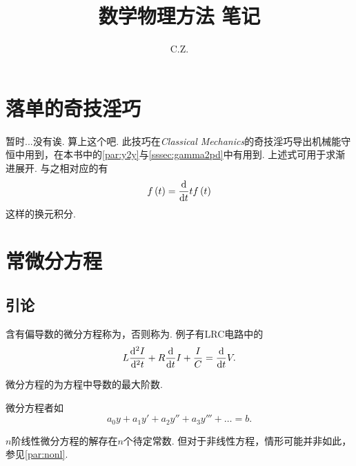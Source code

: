 \documentclass[UTF-8]{ctexart}
\title{数学物理方法 笔记}
\author{C.Z.}
\begin{document}
  \maketitle
  \tableofcontents
  \section*{落单的奇技淫巧}
  暂时...没有诶. 算上这个吧.
  此技巧在\emph{Classical Mechanics}的奇技淫巧导出机械能守恒中用到，在本书中的\ref{par:y2y}与\ref{sssec:gamma2pd}中有用到.
  上述式可用于求渐进展开. 与之相对应的有
  \[ f\left(t\right) = \frac{\mathrm{d}}{\mathrm{d} t}{t}f\left(t\right) \]
  这样的换元积分.
  \section{常微分方程}
  \subsection{引论}
  \label{ssec:ode_int}
  含有偏导数的微分方程称为，否则称为. 例子有LRC电路中的
  \[ L \frac{\mathrm{d}^2 I}{\mathrm{d}^2 t} + R \frac{\mathrm{d}}{\mathrm{d} t}{I} + \frac{I}{C} = \frac{\mathrm{d}}{\mathrm{d} t}{V}.\]
  \par
  微分方程的为方程中导数的最大阶数.
  \par
  微分方程者如
  \[ a_0 y + a_1 y' + a_2 y'' + a_3 y''' + \dots = b. \]
  \par
  $n$阶线性微分方程的解存在$n$个待定常数. 但对于非线性方程，情形可能并非如此，参见\ref{par:nonl}.
\end{document}
